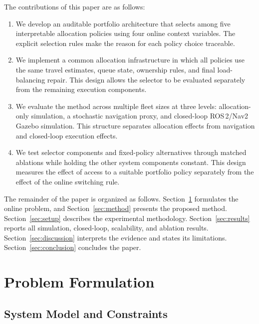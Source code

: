 \documentclass[10pt,letterpaper,onecolumn]{IEEEtran}
\begin{document}
The contributions of this paper are as follows:
\begin{enumerate}
  \item We develop an auditable portfolio architecture that selects among five
  interpretable allocation policies using four online context variables. The
  explicit selection rules make the reason for each policy choice traceable.

  \item We implement a common allocation infrastructure in which all policies
  use the same travel estimates, queue state, ownership rules, and final
  load-balancing repair. This design allows the selector to be evaluated
  separately from the remaining execution components.

  \item We evaluate the method across multiple fleet sizes at three levels:
  allocation-only simulation, a stochastic navigation proxy, and closed-loop
  ROS\,2/Nav2 Gazebo simulation. This structure separates allocation effects
  from navigation and closed-loop execution effects.

  \item We test selector components and fixed-policy alternatives through
  matched ablations while holding the other system components constant. This
  design measures the effect of access to a suitable portfolio policy
  separately from the effect of the online switching rule.
\end{enumerate}

The remainder of the paper is organized as follows.
Section~\ref{sec:problem} formulates the online problem, and
Section~\ref{sec:method} presents the proposed method.
Section~\ref{sec:setup} describes the experimental methodology.
Section~\ref{sec:results} reports all simulation, closed-loop, scalability, and
ablation results. Section~\ref{sec:discussion} interprets the evidence and
states its limitations. Section~\ref{sec:conclusion} concludes the paper.

\section{Problem Formulation}
\label{sec:problem}

\subsection{System Model and Constraints}
\end{document}

